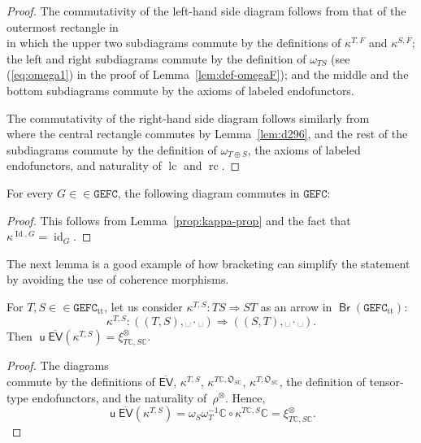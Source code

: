 \documentclass[10pt]{simplearticle}
\newcommand{\tikzinput}[1]{}
\newcommand{\id}{\operatorname{id}}
\newcommand{\Id}{\operatorname{Id}}
\newcommand{\GEFC}{\mathbb{\mathtt{GEFC}}}
\newcommand{\mathsb}[1]{\boldsymbol{\mathsf{#1}}}
\newcommand{\mmph}{\text{{␣}}}
\newcommand{\rc}{\operatorname{rc}}
\newcommand{\lc}{\operatorname{lc}}
\newcommand{\Br}{\operatorname{\mathsb{Br}}}
\renewcommand{\u}{\operatorname{\mathsb u}}
\newcommand{\EV}{\mathsb{EV}}
\newcommand{\ttt}{\operatorname{tt}}
\begin{document}
\begin{proof}
The commutativity of the left-hand side diagram follows from that
of the outermost rectangle in
\[
\tikzinput{d398}
\]
in which the upper two subdiagrams commute by the definitions of $\kappa^{T,F}$
and $\kappa^{S,F}$; the left and right subdiagrams commute by the
definition of $\omega_{TS}$ (see (\ref{eq:omega1}) in the proof
of Lemma~\ref{lem:def-omegaF}); and the middle and the bottom subdiagrams
commute by the axioms of labeled endofunctors.

The commutativity of the right-hand side diagram follows similarly
from
\[
\tikzinput{d484}
\]
where the central rectangle commutes by Lemma~\ref{lem:d296}, and
the rest of the subdiagrams commute by the definition of $\omega_{T\oplus S}$,
the axioms of labeled endofunctors, and naturality
of $\lc$ and $\rc$.
\end{proof}

\begin{lem}\label{lem:d376}
For every $G\in\in\GEFC$,
the
following diagram commutes in $\GEFC$:
\[
\tikzinput{d376}
\]
\end{lem}

\begin{proof}
This follows from Lemma~\ref{prop:kappa-prop} and the fact that
$\kappa^{\Id,G}=\id_{G}$.
\end{proof}

The next
lemma is a good example of how bracketing
can simplify the statement by avoiding the use of coherence morphisms.
\begin{lem}\label{lem:af}
For
$T,S\in\in\GEFC_{\ttt}$, let
us consider $\kappa^{T,S}\colon TS\Rightarrow ST$ as an arrow in
$\Br(\GEFC_{\ttt})$:
\[
\kappa^{T,S}\colon((T,S),\mmph\cdot\mmph)\Rightarrow((S,T),\mmph\cdot\mmph).
\]
Then $\u\overline{\EV}(\kappa^{T,S})=\xi^{\otimes}_{T\mathbb{C},S\mathbb{C}}$.
\end{lem}

\begin{proof}
The diagrams
\[
\tikzinput{d420}
\]
\[
\tikzinput{d482}
\]
commute by the definitions of $\overline{\EV}$, $\kappa^{T,S}$,
$\kappa^{T\mathbb{C},\mathfrak{O}_{S\mathbb{C}}}$, $\kappa^{T,\mathfrak{O}_{S\mathbb{C}}}$,
the definition of tensor-type endofunctors, and the naturality of~$\rho^{\otimes}$.
Hence,
\[
\u\overline{\EV}(\kappa^{T,S})=\omega_{S}\omega^{-1}_{T}\mathbb{C}\circ\kappa^{T\mathbb{C},S}\mathbb{C}=\xi^{\otimes}_{T\mathbb{C},S\mathbb{C}}.
\]
\end{proof}
\end{document}
